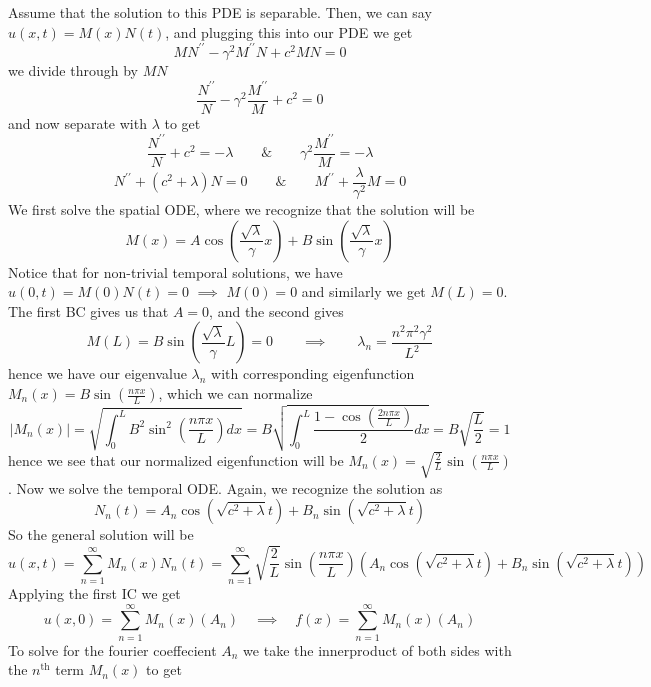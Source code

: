 \documentclass[10pt]{article}
\begin{document}
Assume that the solution to this PDE is separable. Then, we can say $u(x,t) = M(x)N(t)$, and plugging this into our PDE we get
$$MN^{\prime\prime} - \gamma^{2}M^{\prime\prime}N+c^{2}MN = 0$$
we divide through by $MN$
$$\frac{N^{\prime\prime}}{N} - \gamma^{2}\frac{M^{\prime\prime}}{M} + c^{2} = 0$$
and now separate with $\lambda$ to get
$$\frac{N^{\prime\prime}}{N}+ c^{2} = -\lambda \hspace{2em} \& \hspace{2em} \gamma^{2}\frac{M^{\prime\prime}}{M} = -\lambda$$
$$N^{\prime\prime} + (c^{2} + \lambda)N = 0 \hspace{2em} \& \hspace{2em} M^{\prime\prime} + \frac{\lambda}{\gamma^{2}}M = 0$$
We first solve the spatial ODE, where we recognize that the solution will be
$$M(x) = A\cos\left(\frac{\sqrt{\lambda}}{\gamma}x\right) + B\sin\left(\frac{\sqrt{\lambda}}{\gamma}x\right)$$
Notice that for non-trivial temporal solutions, we have $u(0,t) = M(0)N(t) = 0$ $\implies$ $M(0) = 0$ and similarly we get $M(L) = 0$. The first BC gives us that $A = 0$, and the second gives
$$M(L) = B\sin\left(\frac{\sqrt{\lambda}}{\gamma}L\right) = 0 \hspace{2em} \implies \hspace{2em} \lambda_{n} = \frac{n^{2}\pi^{2}\gamma^{2}}{L^{2}}$$
hence we have our eigenvalue $\lambda_{n}$ with corresponding eigenfunction $M_{n}(x) = B\sin\left(\frac{n\pi x}{L}\right)$, which we can normalize
$$|M_{n}(x)| = \sqrt{\int_{0}^{L}B^{2}\sin^{2}\left(\frac{n\pi x}{L}\right)dx} = B\sqrt{\int_{0}^{L}\frac{1 - \cos\left(\frac{2n\pi x}{L}\right)}{2}dx} = B\sqrt{\frac{L}{2}} = 1$$
hence we see that our normalized eigenfunction will be $M_{n}(x) = \sqrt{\frac{2}{L}}\sin\left(\frac{n\pi x}{L}\right)$. Now we solve the temporal ODE. Again, we recognize the solution as
$$N_{n}(t) = A_{n}\cos\left(\sqrt{c^{2} + \lambda}t\right) + B_{n}\sin\left(\sqrt{c^{2} + \lambda}t\right)$$
So the general solution will be
$$u(x,t) = \sum_{n=1}^{\infty}M_{n}(x)N_{n}(t) = \sum_{n=1}^{\infty}\sqrt{\frac{2}{L}}\sin\left(\frac{n\pi x}{L}\right)\left(A_{n}\cos\left(\sqrt{c^{2} + \lambda}t\right) + B_{n}\sin\left(\sqrt{c^{2} + \lambda}t\right)\right)$$
Applying the first IC we get
$$u(x,0) = \sum_{n=1}^{\infty}M_{n}(x)(A_{n}) \hspace{1em} \implies \hspace{1em}f(x) = \sum_{n=1}^{\infty}M_{n}(x)(A_{n})$$
To solve for the fourier coeffecient $A_{n}$ we take the innerproduct of both sides with the $n^{\text{th}}$ term $M_{n}(x)$ to get
\end{document}

